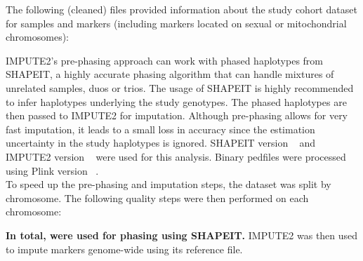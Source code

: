 
The following (cleaned) files provided information about the study cohort
dataset for  samples and 
markers (including  markers located on sexual or
mitochondrial chromosomes):


IMPUTE2's pre-phasing approach can work with phased haplotypes from SHAPEIT, a
highly accurate phasing algorithm that can handle mixtures of unrelated
samples, duos or trios. The usage of SHAPEIT is highly recommended to infer
haplotypes underlying the study genotypes. The phased haplotypes are then
passed to IMPUTE2 for imputation. Although pre-phasing allows for very fast
imputation, it leads to a small loss in accuracy since the estimation
uncertainty in the study haplotypes is ignored. SHAPEIT version
~\cite{Delaneau13_23269371} and IMPUTE2 version
~\cite{Howie09_19543373,Howie11_22384356} were used for
this analysis. Binary pedfiles were processed using Plink version
~\cite{Purcell07_17701901}.\\

To speed up the pre-phasing and imputation steps, the dataset was split by
chromosome. The following quality steps were then performed on each chromosome:


\textbf{In total,  were used for phasing using
SHAPEIT.} IMPUTE2 was then used to impute markers genome-wide using its
reference file.

